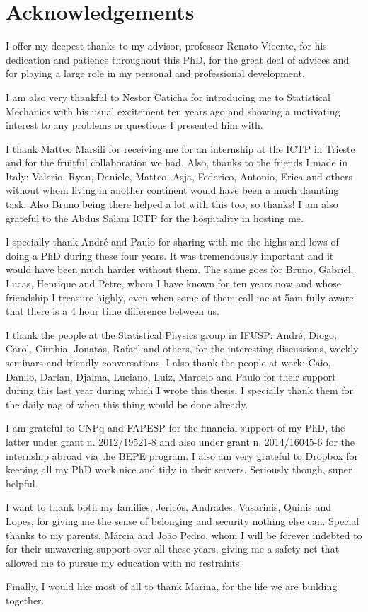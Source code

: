 \chapter*{Acknowledgements}


I offer my deepest thanks to my advisor, professor Renato Vicente, for his dedication and patience throughout this PhD, for the great deal of advices and for playing a large role in my personal and professional development.

I am also very thankful to Nestor Caticha for introducing me to Statistical Mechanics with his usual excitement ten years ago and showing a motivating interest to any problems or questions I presented him with.

I thank Matteo Marsili for receiving me for an internship at the ICTP in Trieste and for the fruitful collaboration we had. Also, thanks to the friends I made in Italy: Valerio, Ryan, Daniele, Matteo, Asja, Federico, Antonio, Erica and others without whom living in another continent would have been a much daunting task. Also Bruno being there helped a lot with this too, so thanks! I am also grateful to the Abdus Salam ICTP for the hospitality in hosting me.

I specially thank André and Paulo for sharing with me the highs and lows of doing a PhD during these four years. It was tremendously important and it would have been much harder without them. The same goes for Bruno, Gabriel, Lucas, Henrique and Petre, whom I have known for ten years now and whose friendship I treasure highly, even when some of them call me at 5am fully aware that there is a 4 hour time difference between us.

I thank the people at the Statistical Physics group in IFUSP: André, Diogo, Carol, Cinthia, Jonatas, Rafael and others, for the interesting discussions, weekly seminars and friendly conversations. I also thank the people at work: Caio, Danilo, Darlan, Djalma, Luciano, Luiz, Marcelo and Paulo for their support during this last year during which I wrote this thesis. I specially thank them for the daily nag of when this thing would be done already.

I am grateful to CNPq and FAPESP for the financial support of my PhD, the latter under grant n. 2012/19521-8 and also under grant n. 2014/16045-6 for the internship abroad via the BEPE program. I also am very grateful to Dropbox for keeping all my PhD work nice and tidy in their servers. Seriously though, super helpful.

I want to thank both my families, Jericós, Andrades, Vasarinis, Quinis and Lopes, for giving me the sense of belonging and security nothing else can. Special thanks to my parents, Márcia and João Pedro, whom I will be forever indebted to for their unwavering support over all these years, giving me a safety net that allowed me to pursue my education with no restraints.

Finally, I would like most of all to thank Marina, for the life we are building together.